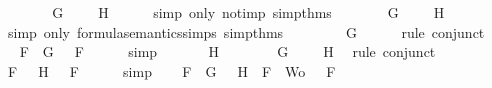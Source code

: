 \begin{isabellebody}
\ \ \isamarkupfalse%
\ \isamarkupfalse%
\ {\isachardoublequoteopen}{\isasymA}\ {\isasymTurnstile}\ G\ {\isasymand}\ {\isasymnot}\ {\isasymA}\ {\isasymTurnstile}\ H{\isachardoublequoteclose}\isanewline
\ \ \ \ \isamarkupfalse%
\ {\isacharparenleft}simp\ only{\isacharcolon}\ not{\isacharunderscore}imp\ simp{\isacharunderscore}thms{\isacharparenleft}{}{\isacharparenright}{\isacharparenright}\isanewline
\ \ \isamarkupfalse%
\ \isamarkupfalse%
\ {\isachardoublequoteopen}{\isasymA}\ {\isasymTurnstile}\ G\ {\isasymand}\ {\isasymA}\ {\isasymTurnstile}\ \isactrlbold {\isasymnot}\ H{\isachardoublequoteclose}\isanewline
\ \ \ \ \isamarkupfalse%
\ {\isacharparenleft}simp\ only{\isacharcolon}\ formula{\isacharunderscore}semantics{\isachardot}simps{\isacharparenleft}{}{\isacharparenright}\ simp{\isacharunderscore}thms{\isacharparenleft}{}{\isacharparenright}{\isacharparenright}\ \isanewline
\ \ \isamarkupfalse%
\ \isamarkupfalse%
\ {\isachardoublequoteopen}{\isasymA}\ {\isasymTurnstile}\ G{\isachardoublequoteclose}\isanewline
\ \ \ \ \isamarkupfalse%
\ {\isacharparenleft}rule\ conjunct{}{\isacharparenright}\isanewline
\ \ \isamarkupfalse%
\ \isamarkupfalse%
\ {}{\isacharcolon}{\isachardoublequoteopen}{\isasymforall}F\ {\isasymin}\ {\isacharbraceleft}G{\isacharbraceright}{\isachardot}\ {\isasymA}\ {\isasymTurnstile}\ F{\isachardoublequoteclose}\isanewline
\ \ \ \ \isamarkupfalse%
\ simp\isanewline
\ \ \isamarkupfalse%
\ {\isachardoublequoteopen}{\isasymA}\ {\isasymTurnstile}\ \isactrlbold {\isasymnot}\ H{\isachardoublequoteclose}\isanewline
\ \ \ \ \isamarkupfalse%
\ {\isacartoucheopen}{\isasymA}\ {\isasymTurnstile}\ G\ {\isasymand}\ {\isasymA}\ {\isasymTurnstile}\ \isactrlbold {\isasymnot}\ H{\isacartoucheclose}\ \isamarkupfalse%
\ {\isacharparenleft}rule\ conjunct{}{\isacharparenright}\isanewline
\ \ \isamarkupfalse%
\ \isamarkupfalse%
\ {}{\isacharcolon}{\isachardoublequoteopen}{\isasymforall}F\ {\isasymin}\ {\isacharbraceleft}\isactrlbold {\isasymnot}\ H{\isacharbraceright}{\isachardot}\ {\isasymA}\ {\isasymTurnstile}\ F{\isachardoublequoteclose}\isanewline
\ \ \ \ \isamarkupfalse%
\ simp\isanewline
\ \ \isamarkupfalse%
\ {\isachardoublequoteopen}{\isasymforall}F\ {\isasymin}\ {\isacharparenleft}{\isacharbraceleft}G{\isacharbraceright}\ {\isasymunion}\ {\isacharbraceleft}\isactrlbold {\isasymnot}\ H{\isacharbraceright}{\isacharparenright}\ {\isasymunion}\ {\isacharparenleft}{\isacharbraceleft}F{\isacharbraceright}\ {\isasymunion}\ Wo{\isacharparenright}{\isachardot}\ {\isasymA}\ {\isasymTurnstile}\ F{\isachardoublequoteclose}\isanewline

\end{isabellebody}
